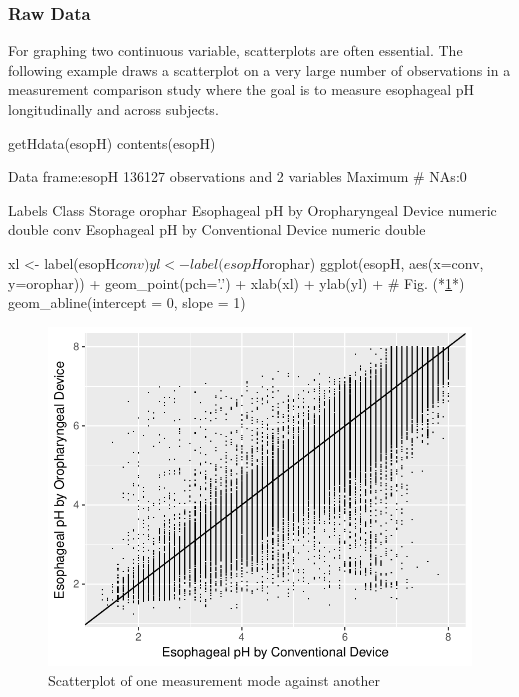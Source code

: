 \subsubsection{Raw Data}
For graphing two continuous variable, scatterplots are often
essential.  The following example draws a scatterplot on a very large
number of observations in a measurement comparison study where the
goal is to measure esophageal pH longitudinally and across subjects.
\begin{Schunk}
\begin{Sinput}
getHdata(esopH)
contents(esopH)
\end{Sinput}
\begin{Soutput}

Data frame:esopH	136127 observations and 2 variables    Maximum # NAs:0


                                       Labels   Class Storage
orophar Esophageal pH by Oropharyngeal Device numeric  double
conv     Esophageal pH by Conventional Device numeric  double
\end{Soutput}
\begin{Sinput}
xl <- label(esopH$conv)
yl <- label(esopH$orophar)
ggplot(esopH, aes(x=conv, y=orophar)) + geom_point(pch='.') +
  xlab(xl) + ylab(yl) +   # Fig. (*\ref{fig:descript-pH}*)
  geom_abline(intercept = 0, slope = 1)
\end{Sinput}
\begin{figure}[htbp]

\centerline{\includegraphics{descript-pH-1} }

\caption[Scatterplot of one measurement mode against another]{Scatterplot of one measurement mode against another}\label{fig:descript-pH}
\end{figure}
\end{Schunk}
